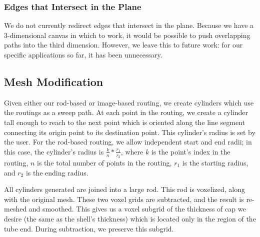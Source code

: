 \subsubsection{Edges that Intersect in the Plane}
We do not currently redirect edges that intersect in the plane.  Because we have a 3-dimensional canvas in which to work, it would be possible to push overlapping paths into the third dimension.  However, we leave this to future work: for our specific applications so far, it has been unnecessary.


\subsection{Mesh Modification}

Given either our rod-based or image-based routing, we create cylinders which use the routings as a sweep path.  At each point in the routing, we create a cylinder tall enough to reach to the next point which is oriented along the line segment connecting its origin point to its destination point.  This cylinder's radius is set by the user.  For the rod-based routing, we allow independent start and end radii; in this case, the cylinder's radius is $\frac{k}{n}*\frac{r_1}{r_2}$, where $k$ is the point's index in the routing, $n$ is the total number of points in the routing, $r_1$ is the starting radius, and $r_2$ is the ending radius.

All cylinders generated are joined into a large rod.  This rod is voxelized, along with the original mesh.  These two voxel grids are subtracted, and the result is re-meshed and smoothed.    This gives us a voxel subgrid of the thickness of cap we desire (the same as the shell's thickness) which is located only in the region of the tube end.  During subtraction, we preserve this subgrid. 

